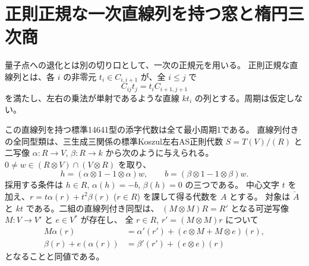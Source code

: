 \section{正則正規な一次直線列を持つ窓と楕円三次商}
\label{sec:regular-normal-linear}
量子点への退化とは別の切り口として、一次の正規元を用いる。
正則正規な直線列とは、各 $i$ の非零元 $t_i\in C_{i,i+1}$ が、全 $i\le j$ で
\[
 C_{ij}t_j=t_i C_{i+1,j+1}
\]
を満たし、左右の乗法が単射であるような直線 $kt_i$ の列とする。周期は仮定しない。

\begin{theorem}\label{thm:regular-normal-linear}
この直線列を持つ標準14641型の添字代数は全て最小周期1である。
直線列付きの全同型類は、三生成三関係の標準Koszul左右AS正則代数
$S=T(V)/(R)$ と二写像 $\alpha:R\to V$, $\beta:R\to k$ から次のように与えられる。
$0\ne w\in(R\otimes V)\cap(V\otimes R)$ を取り、
\[
 h=(\alpha\otimes1-1\otimes\alpha)w,\qquad
 b=(\beta\otimes1-1\otimes\beta)w.
\]
採用する条件は $h\in R$, $\alpha(h)=-b$, $\beta(h)=0$ の三つである。
中心文字 $t$ を加え、$r=t\alpha(r)+t^2\beta(r)$ ($r\in R$) を課して得る代数を $A$ とする。
対象は $\check A$ と $kt$ である。二組の直線列付き同型は、
$(M\otimes M)R=R'$ となる可逆写像 $M:V\to V'$ と $e\in V^*$ が存在し、
全 $r\in R$, $r'=(M\otimes M)r$ について
\begin{align*}
 M\alpha(r)&=\alpha'(r')+(e\otimes M+M\otimes e)(r),\\
 \beta(r)+e(\alpha(r))&=\beta'(r')+(e\otimes e)(r)
\end{align*}
となることと同値である。
\end{theorem}
